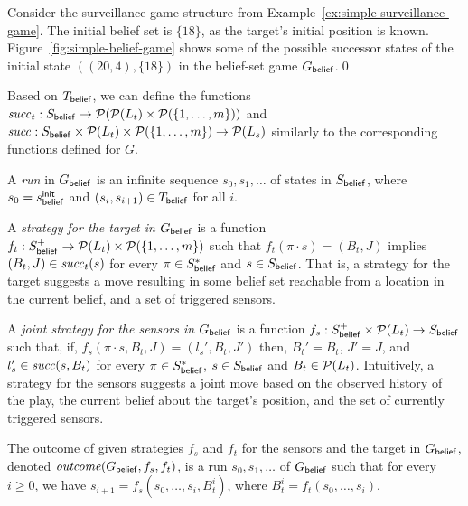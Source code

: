 \begin{example}\label{ex:simple-belief-game}
Consider the surveillance game structure from Example~\ref{ex:simple-surveillance-game}. The initial belief set is $\{18\}$, as the target's initial position is known. Figure~\ref{fig:simple-belief-game} shows some of the possible successor states of the initial state $((20,4),\{18\})$  in the belief-set game $G_{\mathsf{belief}}$.\qed
\end{example}

Based on  $T_{\mathsf{belief}}$, we can define the functions $\mathit{succ}_t : S_{\mathsf{belief}} \to \mathcal{P}(\mathcal{P}(L_t) \times  \mathcal{P}(\{1,\ldots,m\}))$ and  $\mathit{succ} : S_{\mathsf{belief}} \times \mathcal{P}(L_t) \times  \mathcal{P}(\{1,\ldots,m\}) \to \mathcal{P}(L_s)$ similarly to the corresponding functions defined for $G$. 

A \emph{run} in $G_{\mathsf{belief}}$ is an infinite sequence $s_0,s_1,\ldots$ of states in $S_{\mathsf{belief}}$, where $s_0 = s_{\mathsf{belief}}^{\mathsf{init}}$ and $(s_i,s_{i+1}) \in T_{\mathsf{belief}}$ for all $i$. 

A \emph{strategy for the target in $G_{\mathsf{belief}}$} is a function $f_t: S_{\mathsf{belief}}^+ \to \mathcal{P}(L_t) \times \mathcal{P}(\{1,\ldots,m\})$ such that $f_t(\pi\cdot s) = (B_t, J)$ implies $(B_t ,J)\in \mathit{succ}_t(s)$  for every $\pi \in S_{\mathsf{belief}}^*$ and $s \in S_{\mathsf{belief}}$. That is, a strategy for the target suggests a move resulting in some belief set reachable from a location in the current belief, and a set of triggered sensors.

A \emph{joint strategy for the sensors in $G_{\mathsf{belief}}$} is a function $f_s : S_{\mathsf{belief}}^+ \times \mathcal{P}(L_t) \to S_{\mathsf{belief}}$ such that, if, $f_s(\pi\cdot s,B_t,J) = (l_s',B_t,J')$ then, $B_t' = B_t$, $J' = J$, and $l_s' \in \mathit{succ}(s,B_t)$ for every $\pi \in S_{\mathsf{belief}}^*$, $s \in S_{\mathsf{belief}}$ and $B_t \in \mathcal{P}(L_t)$. Intuitively, a strategy for the sensors suggests a joint move based on the observed history of the play, the current belief about the target's position, and the set of currently triggered sensors.

The outcome of given strategies $f_s$ and $f_t$ for the sensors and the target in $G_{\mathsf{belief}}$, denoted $\mathit{outcome}(G_{\mathsf{belief}},f_s,f_t)$, is a run $s_0,s_1,\ldots$ of $G_{\mathsf{belief}}$ such that for every $i \geq 0$, we have $s_{i+1} = f_s(s_0,\ldots,s_i,B_t^i)$, where $B_t^i = f_t(s_0,\ldots,s_i)$.

